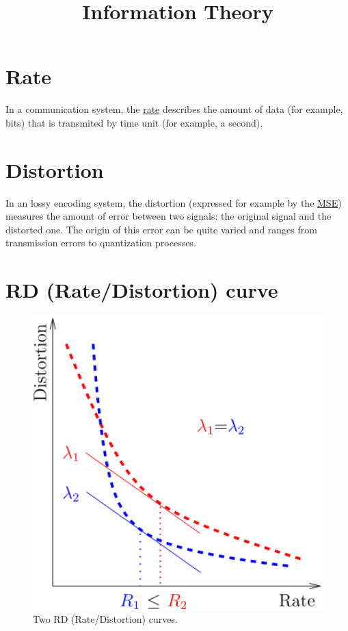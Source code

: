 
\title{Information Theory}
\maketitle

\tableofcontents

\section{Rate}

In a communication system, the
\href{https://en.wikipedia.org/wiki/Bit_rate}{rate} describes the
amount of data (for example, bits) that is transmited by time unit
(for example, a second).

\section{Distortion}

In an lossy encoding system, the distortion (expressed for example by
the \href{https://en.wikipedia.org/wiki/Mean_squared_error}{MSE})
measures the amount of error between two signals: the original signal
and the distorted one. The origin of this error can be quite varied
and ranges from transmission errors to quantization processes.

\section{RD (Rate/Distortion) curve}

\begin{figure}
  \centering
  \includegraphics[width=1.0\textwidth]{graphics/RD_slopes} 
  \caption{Two RD (Rate/Distortion) curves.}
  \label{fig:RD_slopes}
\end{figure}

